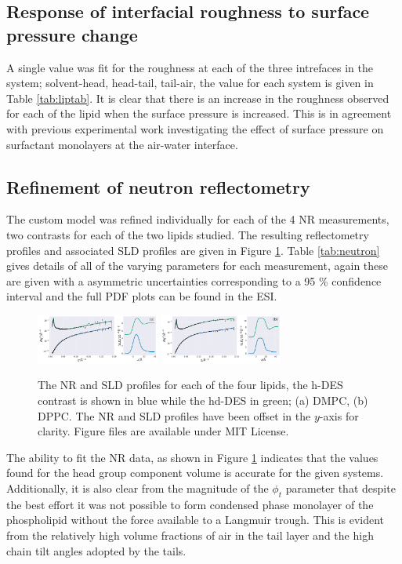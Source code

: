 \documentclass[twoside,twocolumn,9pt]{article}
\begin{document}
\subsection{Response of interfacial roughness to surface pressure change}
A single value was fit for the roughness at each of the three intrefaces in the system; solvent-head, head-tail, tail-air, the value for each system is given in Table \ref{tab:liptab}. It is clear that there is an increase in the roughness observed for each of the lipid when the surface pressure is increased. This is in agreement with previous experimental work investigating the effect of surface pressure on surfactant monolayers at the air-water interface.\cite{Campbell2018,Tikhonov2000}

\subsection{Refinement of neutron reflectometry}
The custom model was refined individually for each of the 4 NR measurements, two contrasts for each of the two lipids studied. The resulting reflectometry profiles and associated SLD profiles are given in Figure \ref{fig:neutron}. Table \ref{tab:neutron} gives details of all of the varying parameters for each measurement, again these are given with a asymmetric uncertainties corresponding to a 95 \% confidence interval and the full PDF plots can be found in the ESI.

\begin{figure}
	\centering
	\includegraphics[width=0.36\textwidth]{figures/nDMPC_all_data}
	\includegraphics[width=0.36\textwidth]{figures/nDPPC_all_data}
	\caption{The NR and SLD profiles for each of the four lipids, the h-DES contrast is shown in blue while the hd-DES in green; (a) DMPC, (b) DPPC. The NR and SLD profiles have been offset in the $y$-axis for clarity. Figure files are available under MIT License.\cite{mccluskey_2018}}
	\label{fig:neutron}
\end{figure}

The ability to fit the NR data, as shown in Figure \ref{fig:neutron} indicates that the values found for the head group component volume is accurate for the given systems. Additionally, it is also clear from the magnitude of the $\phi_t$ parameter that despite the best effort it was not possible to form condensed phase monolayer of the phospholipid without the force available to a Langmuir trough. This is evident from the relatively high volume fractions of air in the tail layer and the high chain tilt angles adopted by the tails. 
\end{document}
